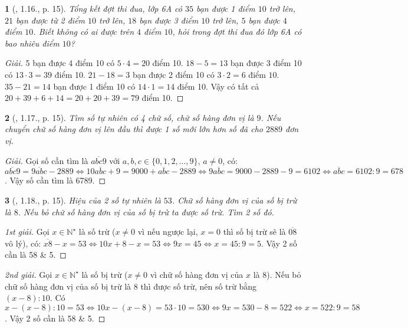 \documentclass{article}
\newtheorem{baitoan}{}
\begin{document}
\begin{baitoan}[\cite{Binh_boi_duong_Toan_6_tap_1}, 1.16., p. 15]
	Tổng kết đợt thi đua, lớp 6A có $35$ bạn được 1 điểm $10$ trở lên, $21$ bạn được từ 2 điểm $10$ trở lên, $18$ bạn được 3 điểm $10$ trở lên, $5$ bạn được $4$ điểm $10$. Biết không có ai được trên $4$ điểm $10$, hỏi trong đợt thi đua đó lớp 6A có bao nhiêu điểm $10$?
\end{baitoan}

\begin{proof}[Giải]
	5 bạn được 4 điểm 10 có $5\cdot4 = 20$ điểm 10. $18 - 5 = 13$ bạn được 3 điểm 10 có $13\cdot3 = 39$ điểm 10. $21 - 18 = 3$ bạn được 2 điểm 10 có $3\cdot2 = 6$ điểm $10$. $35 - 21 = 14$ bạn được 1 điểm 10 có $14\cdot1 = 14$ điểm 10. Vậy có tất cả $20 + 39 + 6 + 14 = 20 + 20 + 39 = 79$ điểm 10.
\end{proof}

\begin{baitoan}[\cite{Binh_boi_duong_Toan_6_tap_1}, 1.17., p. 15]
	Tìm số tự nhiên có 4 chữ số, chữ số hàng đơn vị là $9$. Nếu chuyển chữ số hàng đơn vị lên đầu thì được 1 số mới lớn hơn số đã cho $2889$ đơn vị.
\end{baitoan}

\begin{proof}[Giải]
	Gọi số cần tìm là $\overline{abc9}$ với $a,b,c\in\{0,1,2,\ldots,9\}$, $a\ne0$, có: $\overline{abc9} = \overline{9abc} - 2889\Leftrightarrow10\overline{abc} + 9 = 9000 + \overline{abc} - 2889\Leftrightarrow9\overline{abc} = 9000 - 2889 - 9 = 6102\Leftrightarrow\overline{abc} = 6102:9 = 678$. Vậy số cần tìm là 6789.
\end{proof}

\begin{baitoan}[\cite{Binh_boi_duong_Toan_6_tap_1}, 1.18., p. 15]
	Hiệu của 2 số tự nhiên là $53$. Chữ số hàng đơn vị của số bị trừ là $8$. Nếu bỏ chữ số hàng đơn vị của số bị trừ ta được số trừ. Tìm 2 số đó.
\end{baitoan}

\begin{proof}[1st giải]
	Gọi $x\in\mathbb{N}^\star$ là số trừ ($x\ne0$ vì nếu ngược lại, $x = 0$ thì số bị trừ sẽ là $\overline{08}$ vô lý), có: $\overline{x8} - x = 53\Leftrightarrow10x + 8 - x = 53\Leftrightarrow9x = 45\Leftrightarrow x = 45:9 = 5$. Vậy 2 số cần là 58 \& 5.
\end{proof}

\begin{proof}[2nd giải]
	Gọi $x\in\mathbb{N}^\star$ là số bị trừ ($x\ne0$ vì chữ số hàng đơn vị của $x$ là 8). Nếu bỏ chữ số hàng đơn vị của số bị trừ là 8 thì được số trừ, nên số trừ bằng $(x - 8):10$. Có $x - (x - 8):10 = 53\Leftrightarrow10x - (x - 8) = 53\cdot10 = 530\Leftrightarrow9x = 530 - 8 = 522\Leftrightarrow x = 522:9 = 58$. Vậy 2 số cần là 58 \& 5.
\end{proof}
\end{document}
